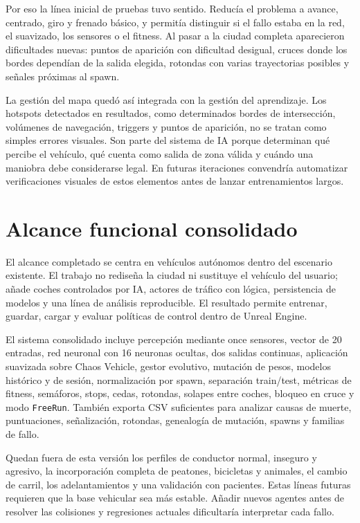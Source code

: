 Por eso la línea inicial de pruebas tuvo sentido. Reducía el problema a avance, centrado, giro y frenado básico, y permitía distinguir si el fallo estaba en la red, el suavizado, los sensores o el fitness. Al pasar a la ciudad completa aparecieron dificultades nuevas: puntos de aparición con dificultad desigual, cruces donde los bordes dependían de la salida elegida, rotondas con varias trayectorias posibles y señales próximas al spawn.

La gestión del mapa quedó así integrada con la gestión del aprendizaje. Los hotspots detectados en resultados, como determinados bordes de intersección, volúmenes de navegación, triggers y puntos de aparición, no se tratan como simples errores visuales. Son parte del sistema de IA porque determinan qué percibe el vehículo, qué cuenta como salida de zona válida y cuándo una maniobra debe considerarse legal. En futuras iteraciones convendría automatizar verificaciones visuales de estos elementos antes de lanzar entrenamientos largos.

\section{Alcance funcional consolidado}

El alcance completado se centra en vehículos autónomos dentro del escenario existente. El trabajo no rediseña la ciudad ni sustituye el vehículo del usuario; añade coches controlados por IA, actores de tráfico con lógica, persistencia de modelos y una línea de análisis reproducible. El resultado permite entrenar, guardar, cargar y evaluar políticas de control dentro de Unreal Engine.

El sistema consolidado incluye percepción mediante once sensores, vector de 20 entradas, red neuronal con 16 neuronas ocultas, dos salidas continuas, aplicación suavizada sobre Chaos Vehicle, gestor evolutivo, mutación de pesos, modelos histórico y de sesión, normalización por spawn, separación train/test, métricas de fitness, semáforos, stops, cedas, rotondas, solapes entre coches, bloqueo en cruce y modo \texttt{FreeRun}. También exporta CSV suficientes para analizar causas de muerte, puntuaciones, señalización, rotondas, genealogía de mutación, spawns y familias de fallo.

Quedan fuera de esta versión los perfiles de conductor normal, inseguro y agresivo, la incorporación completa de peatones, bicicletas y animales, el cambio de carril, los adelantamientos y una validación con pacientes. Estas líneas futuras requieren que la base vehicular sea más estable. Añadir nuevos agentes antes de resolver las colisiones y regresiones actuales dificultaría interpretar cada fallo.


